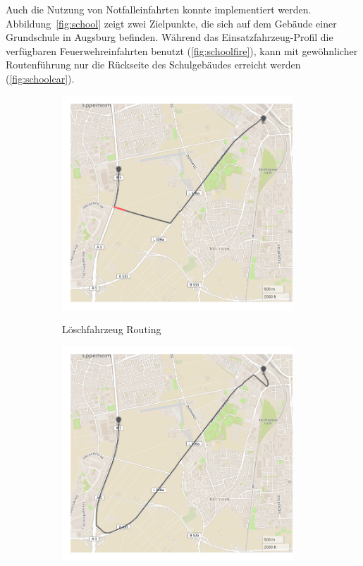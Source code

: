 Auch die Nutzung von Notfalleinfahrten konnte implementiert werden.
Abbildung~\ref{fig:school} zeigt zwei Zielpunkte, die sich auf dem Gebäude einer Grundschule in Augsburg befinden. 
Während das Einsatzfahrzeug-Profil die verfügbaren Feuerwehreinfahrten benutzt (\ref{fig:schoolfire}), kann mit gewöhnlicher Routenführung nur die Rückseite des Schulgebäudes erreicht werden (\ref{fig:schoolcar}).

\begin{figure}[htb]
\centering
\begin{subfigure}{0.49\textwidth}
\centering
\includegraphics[width = 0.95\textwidth]{../media/notauffahrt.png} \\
\caption{Löschfahrzeug Routing}
\label{fig:emeramp}
\end{subfigure}
\begin{subfigure}{0.49\textwidth}
\centering
\includegraphics[width = 0.95\textwidth]{../media/normalauffahrt.png} \\

\end{subfigure}
\end{figure}
